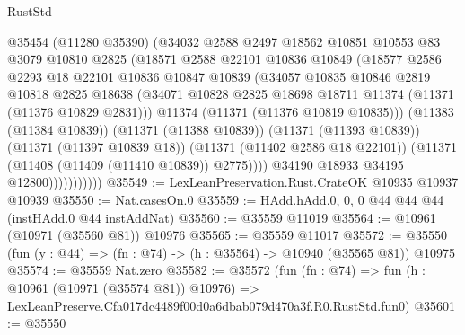 \begin{lexlean}{RustStd}
\begin{coremodule}
                        @35454
                        (@11280 @35390)
                        (@34032
                          @2588
                          @2497
                          @18562
                          @10851
                          @10553
                          @83
                          @3079
                          @10810
                          @2825
                          (@18571
                            @2588
                            @22101
                            @10836
                            @10849
                            (@18577
                              @2586
                              @2293
                              @18
                              @22101
                              @10836
                              @10847
                              @10839
                              (@34057
                                @10835
                                @10846
                                @2819
                                @10818
                                @2825
                                @18638
                                (@34071
                                  @10828
                                  @2825
                                  @18698
                                  @18711
                                  @11374
                                  (@11371 (@11376 @10829 @2831)))
                                @11374
                                (@11371 (@11376 @10819 @10835)))
                              (@11383 (@11384 @10839))
                              (@11371 (@11388 @10839))
                              (@11371 (@11393 @10839))
                              (@11371 (@11397 @10839 @18))
                              (@11371 (@11402 @2586 @18 @22101))
                              (@11371 (@11408 (@11409 (@11410 @10839)) @2775))))
                          @34190
                          @18933
                          @34195
                          @12800)))))))))))
@35549 := LexLeanPreservation.Rust.CrateOK @10935 @10937 @10939
@35550 := Nat.casesOn.{0}
@35559 := HAdd.hAdd.{0, 0, 0} @44 @44 @44 (instHAdd.{0} @44 instAddNat)
@35560 := @35559 @11019
@35564 := @10961 (@10971 (@35560 @81)) @10976
@35565 := @35559 @11017
@35572 := @35550 (fun (y : @44) => (fn : @74) -> (h : @35564) -> @10940 (@35565 @81)) @10975
@35574 := @35559 Nat.zero
@35582 := @35572
    (fun (fn : @74) =>
    fun (h : @10961 (@10971 (@35574 @81)) @10976) =>
    LexLeanPreserve.Cfa017dc4489f00d0a6dbab079d470a3f.R0.RustStd.fun0)
@35601 := @35550

\end{coremodule}
\end{lexlean}
